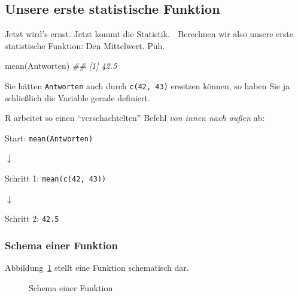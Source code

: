 \documentclass[
  a4paper,
  DIV=11]{scrreprt}
\newenvironment{Shaded}{\begin{snugshade}}{\end{snugshade}}
\newcommand{\DocumentationTok}[1]{\textcolor[rgb]{0.37,0.37,0.37}{\textit{#1}}}
\newcommand{\FunctionTok}[1]{\textcolor[rgb]{0.28,0.35,0.67}{#1}}
\newcommand{\NormalTok}[1]{\textcolor[rgb]{0.00,0.23,0.31}{#1}}
\theoremstyle{definition}
\theoremstyle{definition}
\theoremstyle{definition}
\theoremstyle{remark}
\begin{document}
\subsection{Unsere erste statistische Funktion}\label{sec-first-fun}

Jetzt wird's ernst. Jetzt kommt die Statistik. 🧟 Berechnen wir also
unsere erste statistische Funktion: Den Mittelwert. Puh.

\begin{Shaded}
\begin{Highlighting}[]
\FunctionTok{mean}\NormalTok{(Antworten)}
\DocumentationTok{\#\# [1] 42.5}
\end{Highlighting}
\end{Shaded}

Sie hätten \texttt{Antworten} auch durch \texttt{c(42,\ 43)} ersetzen
können, so haben Sie ja schließlich die Variable gerade definiert.

R arbeitet so einen ``verschachtelten'' Befehl \emph{von innen nach
außen} ab:

Start: \texttt{mean(Antworten)}

{\(\downarrow\)}

Schritt 1: \texttt{mean(c(42,\ 43))}

{\(\downarrow\)}

Schritt 2: \texttt{42.5}

\subsubsection{Schema einer Funktion}\label{schema-einer-funktion}

Abbildung~\ref{fig-function-schema} stellt eine Funktion schematisch
dar.

\begin{figure}


\caption{\label{fig-function-schema}Schema einer Funktion}

\end{figure}%
\end{document}

